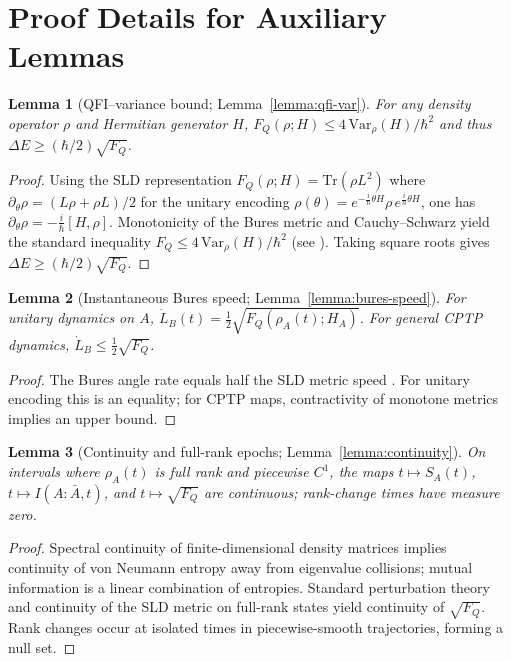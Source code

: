 \documentclass[10pt]{article}
\newtheorem{lemma}{Lemma}
\begin{document}
\section{Proof Details for Auxiliary Lemmas}

\begin{lemma}[QFI–variance bound; Lemma~\ref{lemma:qfi-var}]
For any density operator \(\rho\) and Hermitian generator \(H\),
\(F_Q(\rho;H) \le 4\,\mathrm{Var}_\rho(H)/\hbar^2\) and thus \(\Delta E\ge (\hbar/2)\sqrt{F_Q}\).
\end{lemma}
\begin{proof}
Using the SLD representation \(F_Q(\rho;H)=\mathrm{Tr}(\rho L^2)\) where \(\partial_\theta\rho = (L\rho+\rho L)/2\) for the unitary encoding \(\rho(\theta)=e^{-\tfrac{i}{\hbar}\theta H}\rho\,e^{\tfrac{i}{\hbar}\theta H}\), one has
\(\partial_\theta\rho = -\tfrac{i}{\hbar}[H,\rho]\). Monotonicity of the Bures metric and Cauchy–Schwarz yield the standard inequality \(F_Q\le 4\,\mathrm{Var}_\rho(H)/\hbar^2\) (see \cite{BraunsteinCaves1994,Hayashi2006}). Taking square roots gives \(\Delta E\ge (\hbar/2)\sqrt{F_Q}\).
\end{proof}

\begin{lemma}[Instantaneous Bures speed; Lemma~\ref{lemma:bures-speed}]
For unitary dynamics on \(A\), \(\dot L_B(t)=\tfrac{1}{2}\sqrt{F_Q(\rho_A(t);H_A)}\). For general CPTP dynamics, \(\dot L_B\le \tfrac{1}{2}\sqrt{F_Q}\).
\end{lemma}
\begin{proof}
The Bures angle rate equals half the SLD metric speed \cite{BraunsteinCaves1994}. For unitary encoding this is an equality; for CPTP maps, contractivity of monotone metrics implies an upper bound.
\end{proof}

\begin{lemma}[Continuity and full-rank epochs; Lemma~\ref{lemma:continuity}]
On intervals where \(\rho_A(t)\) is full rank and piecewise \(C^1\), the maps \(t\mapsto S_A(t)\), \(t\mapsto I(A{:}\bar A,t)\), and \(t\mapsto \sqrt{F_Q}\) are continuous; rank-change times have measure zero.
\end{lemma}
\begin{proof}
Spectral continuity of finite-dimensional density matrices implies continuity of von Neumann entropy away from eigenvalue collisions; mutual information is a linear combination of entropies. Standard perturbation theory and continuity of the SLD metric on full-rank states yield continuity of \(\sqrt{F_Q}\). Rank changes occur at isolated times in piecewise-smooth trajectories, forming a null set.
\end{proof}
\end{document}
